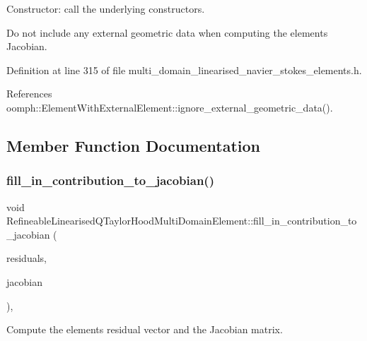 Constructor\+: call the underlying constructors. 

Do not include any external geometric data when computing the element\textquotesingle{}s Jacobian. 

Definition at line 315 of file multi\+\_\+domain\+\_\+linearised\+\_\+navier\+\_\+stokes\+\_\+elements.\+h.



References oomph\+::\+Element\+With\+External\+Element\+::ignore\+\_\+external\+\_\+geometric\+\_\+data().



\subsection{Member Function Documentation}
\mbox{\label{classRefineableLinearisedQTaylorHoodMultiDomainElement_ae9582bd850c53a41150ffd4c67dd0f00}} 
\subsubsection{\texorpdfstring{fill\+\_\+in\+\_\+contribution\+\_\+to\+\_\+jacobian()}{fill\_in\_contribution\_to\_jacobian()}}
{\footnotesize\ttfamily void Refineable\+Linearised\+Q\+Taylor\+Hood\+Multi\+Domain\+Element\+::fill\+\_\+in\+\_\+contribution\+\_\+to\+\_\+jacobian (\begin{DoxyParamCaption}\item[{\hyperlink{classoomph_1_1Vector}{Vector}$<$ double $>$ \&}]{residuals,  }\item[{\hyperlink{classoomph_1_1DenseMatrix}{Dense\+Matrix}$<$ double $>$ \&}]{jacobian }\end{DoxyParamCaption})\hspace{0.3cm}{\ttfamily [inline]}, {\ttfamily [virtual]}}



Compute the element\textquotesingle{}s residual vector and the Jacobian matrix. 



